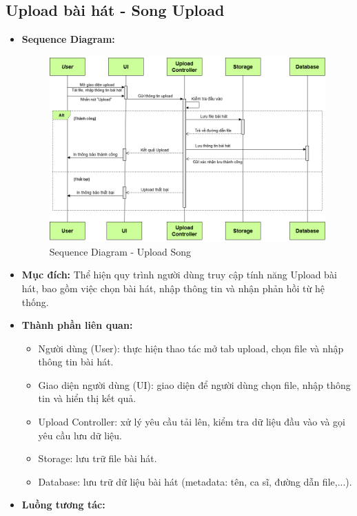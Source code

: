 \documentclass[a4paper]{article}
\begin{document}
\subsection{Upload bài hát - Song Upload}
\begin{itemize}
	\item \textbf{Sequence Diagram:}
	      \begin{figure}[H]
				\centering
				\includegraphics[width=1\textwidth]{Images/upload_sequence.png}
				\caption{Sequence Diagram - Upload Song}
	      \end{figure}
	\item \textbf{Mục đích:} Thể hiện quy trình người dùng truy cập tính năng Upload bài hát, bao gồm việc chọn bài hát, nhập thông tin và nhận phản hồi từ hệ thống.
	\item \textbf{Thành phần liên quan:}
	      \begin{itemize}
		      \item Người dùng (User): thực hiện thao tác mở tab upload, chọn file và nhập thông tin bài hát.
		      \item Giao diện người dùng (UI): giao diện để người dùng chọn file, nhập thông tin và hiển thị kết quả.
		      \item Upload Controller: xử lý yêu cầu tải lên, kiểm tra dữ liệu đầu vào và gọi yêu cầu lưu dữ liệu.
		      \item Storage: lưu trữ file bài hát.
			  \item Database: lưu trữ dữ liệu bài hát (metadata: tên, ca sĩ, đường dẫn file,...).
	      \end{itemize}
	\item \textbf{Luồng tương tác:}
	      \begin{enumerate}

\end{enumerate}
\end{itemize}
\end{document}
